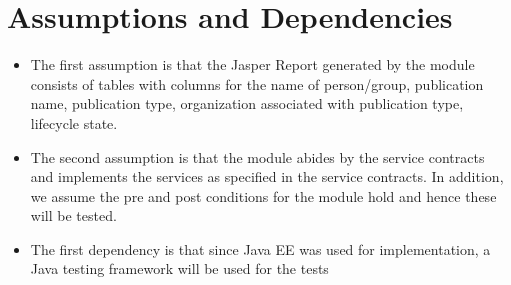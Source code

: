 \section{Assumptions and Dependencies}
\label{sec:assumptions}
\begin{itemize}
	\item The first assumption is that the Jasper Report generated by the module consists of tables with columns for the name of person/group, publication name, publication type, organization associated with publication type, lifecycle state.
	\item The second assumption is that the module abides by the service contracts and implements the services as specified in the service contracts. In addition, we assume the pre and post conditions for the module hold and hence these will be tested.
	\item The first dependency is that since Java EE was used for implementation, a Java testing framework will be used for the tests
\end{itemize}
\hypertarget{labelr}{}
